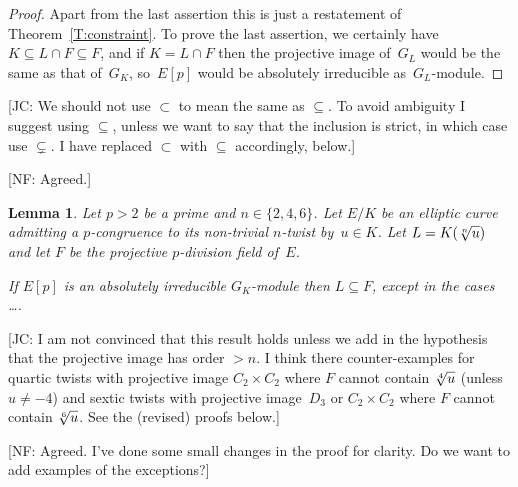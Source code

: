 \documentclass[12pt, reqno]{amsart}
\numberwithin{equation}{section}
\newtheorem{lemma}[theorem]{Lemma}
\theoremstyle{definition}
\theoremstyle{remark}
\newcommand{\nf}[1]{{\color{blue} \textsf{[NF: #1]}}}
\newcommand{\jc}[1]{{\color{darkgreen} \textsf{[JC: #1]}}}
\begin{document}
\begin{proof}
Apart from the last assertion this is just a restatement of
Theorem~\ref{T:constraint}.  To prove the last assertion, we certainly
have $K\subseteq L\cap F\subseteq F$, and if $K=L\cap F$ then the
projective image of~$G_L$ would be the same as that of~$G_K$,
so~$E[p]$ would be absolutely irreducible as~$G_L$-module.
\end{proof}

\jc{We should not use $\subset$ to mean the same as $\subseteq$.  To
  avoid ambiguity I suggest using $\subseteq$, unless we want to say
  that the inclusion is strict, in which case use $\subsetneq$. I have
  replaced $\subset$ with $\subseteq$ accordingly, below.}
  
  \nf{Agreed.}

\begin{lemma} \label{L:LinF}
Let $p > 2$ be a prime and $n \in \{2,4,6\}$.  Let $E/K$ be an
elliptic curve admitting a $p$-congruence to its non-trivial $n$-twist
by~$u \in K$. Let $L = K(\root n \of u)$ and let $F$ be the projective
$p$-division field of~$E$.

If $E[p]$ is an absolutely irreducible $G_K$-module then $L \subseteq
F$, except in the cases \dots.
\end{lemma}

\jc{I am not convinced that this result holds unless we add in the
  hypothesis that the projective image has order $>n$.  I think there
  counter-examples for quartic twists with projective image $C_2\times
  C_2$ where $F$ cannot contain $\root4\of u$ (unless $u\not=-4$) and
  sextic twists with projective image~$D_3$ or $C_2\times C_2$ where
  $F$ cannot contain $\root6\of u$.  See the (revised) proofs below.}

 \nf{Agreed. I've done some small changes in the proof for clarity. Do we want to add examples of the exceptions?} 
  
\end{document}

